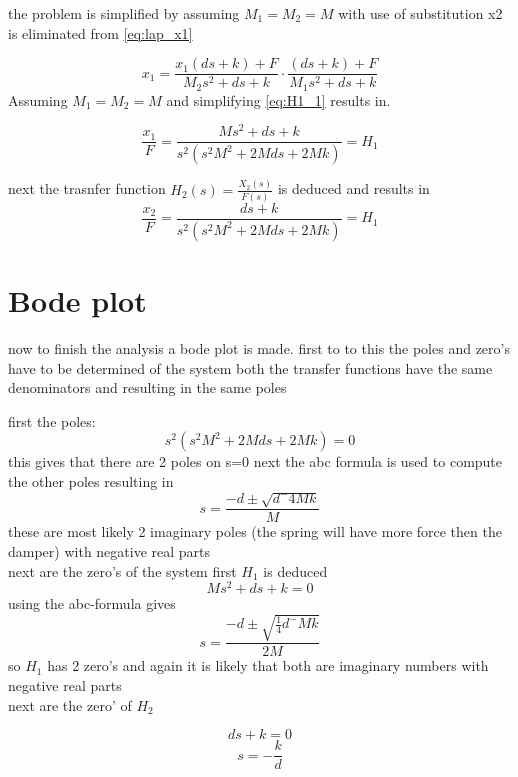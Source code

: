 the problem is simplified by assuming $M_1=M_2=M$ with use of substitution x2 is eliminated from \eqref{eq:lap_x1}

\begin{equation}
\label{eq:H1_1}
x_1=\frac{x_1(ds+k)+F}{M_2s^2+ds+k}\cdot\frac{(ds+k)+F}{M_1s^2+ds+k}
\end{equation}
Assuming $M_1=M_2=M$ and simplifying \eqref{eq:H1_1} results in.

\begin{equation}
\label{eq:H1_2}
\frac{x_1}{F}=\frac{Ms^2+ds+k}{s^2(s^2M^2+2Mds+2Mk)}=H_1
\end{equation}

next the trasnfer function ${ H }_{ 2 }(s)=\frac { { X }_{ 2 }(s) }{ F(s) } $ is deduced and results in
\begin{equation}
\label{eq:H2}
\frac{x_2}{F}=\frac{ds+k}{s^2(s^2M^2+2Mds+2Mk)}=H_1
\end{equation}
\section{Bode plot}
now to finish the analysis a bode plot is made.
first to to this the poles and zero's have to be determined of the system
both the transfer functions have the same denominators and resulting in the same poles

first the poles:
\begin{equation}
s^2(s^2M^2+2Mds+2Mk)=0
\end{equation}
this gives that there are 2 poles on s=0
next the abc formula is used to compute the other poles resulting in
\begin{equation}
s=\frac{-d\pm\sqrt{d^-4Mk}}{M}
\end{equation}
these are most likely 2 imaginary poles (the spring will have more force then the damper) with negative real parts\\
next are the zero's of the system first $H_1$ is deduced
\begin{equation}
Ms^2+ds+k=0
\end{equation}
using the abc-formula gives
\begin{equation}
s=\frac{-d\pm\sqrt{\frac{1}{4}d^-Mk}}{2M}
\end{equation}
so $H_1$ has 2 zero's and again it is likely that both are imaginary numbers with negative real parts\\
next are the zero' of $H_2$

\begin{equation}
ds+k=0
\end{equation}
\begin{equation}
s=-\frac{k}{d}
\end{equation}


